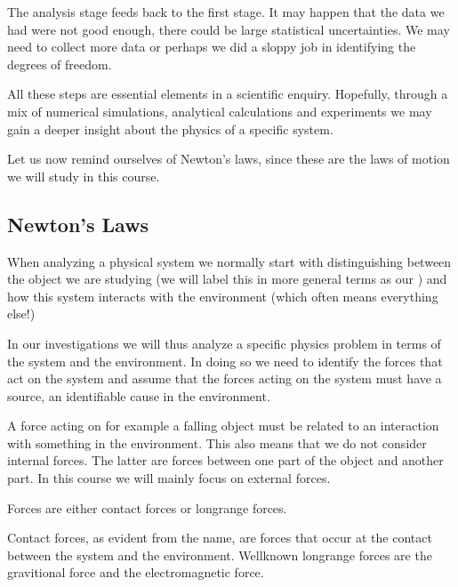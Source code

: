 \documentclass[letterpaper,10pt,english]{sphinxmanual}
\begin{document}
The analysis stage feeds back to the first stage. It may happen that
the data we had were not good enough, there could be large statistical
uncertainties. We may need to collect more data or perhaps we did a
sloppy job in identifying the degrees of freedom.

All these steps are essential elements in a scientific
enquiry. Hopefully, through a mix of numerical simulations, analytical
calculations and experiments we may gain a deeper insight about the
physics of a specific system.

Let us now remind ourselves of Newton’s laws, since these are the laws of motion we will study in this course.


\subsection{Newton’s Laws}
\label{\detokenize{chapter2:newton-s-laws}}
When analyzing a physical system we normally start with distinguishing between the object we are studying (we will label this in more general terms as our ) and how this system interacts with the environment (which often means everything else!)

In our investigations we will thus analyze a specific physics problem in terms of the system and the environment.
In doing so we need to identify the forces that act on the system and assume that the
forces acting on the system must have a source, an identifiable cause in
the environment.

A force acting on for example a falling object must be related to an interaction with something in the environment.
This also means that we do not consider internal forces. The latter are forces between
one part of the object and another part. In this course we will mainly focus on external forces.

Forces are either contact forces or long\sphinxhyphen{}range forces.

Contact forces, as evident from the name, are forces that occur at the contact between
the system and the environment. Well\sphinxhyphen{}known long\sphinxhyphen{}range forces are the gravitional force and the electromagnetic force.
\end{document}

